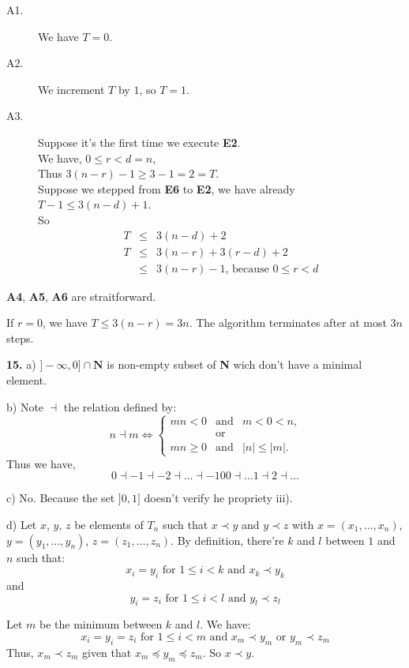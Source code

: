 \documentclass[a4paper,12pt]{article}
\begin{document}
\begin{description}
\item[A1.]
We have $T = 0$.
\item[A2.]
We increment $T$ by $1$, so $T = 1$.
\item[A3.]
Suppose it's the first time we execute \textbf{E2}.\\
We have, $0 \le r < d = n$,\\
Thus $3(n-r)-1 \ge 3 - 1 = 2 = T$.\\
Suppose we stepped from \textbf{E6} to \textbf{E2}, we have already
$ T - 1 \le 3(n - d)+1$.\\
So
\begin{eqnarray*}
T & \le & 3(n-d) + 2\\
T & \le & 3(n-r) + 3(r-d) + 2\\
& \le & 3(n-r) - 1\mbox{, because } 0 \le r < d
\end{eqnarray*}

\end{description}

\textbf{A4}, \textbf{A5}, \textbf{A6} are straitforward.

\medskip
If $r = 0$, we have $T \le 3(n-r) = 3n$.  The algorithm terminates after at
most $3n$ steps.

\bigskip
\noindent
\textbf{15.}
a) $\rbrack -\infty, 0 \rbrack \cap \mathbf{N}$ is non-empty subset of 
\textbf{N} wich don't have a minimal element.

b) Note $\dashv$ the relation defined by:
\[ n \dashv m \Leftrightarrow \left\{\begin{array}{lll}
	mn < 0 & \mbox{and} & m < 0 < n\mbox{,}\\
	& \mbox{or} &\\
        mn \ge 0 & \mbox{and} & |n| \le |m|. \end{array}\right. \]
Thus we have,
 \[ 0 \dashv -1 \dashv -2 \dashv \ldots \dashv -100 \dashv \ldots 1 \dashv 
2 \dashv \ldots \]

c) No.  Because the set $\rbrack 0, 1 \rbrack$ doesn't verify he propriety iii).

d) Let $x$, $y$, $z$ be elements of $T_n$ such that $x \prec y$ and
 $y \prec z$ with $x = (x_1, \ldots, x_n)$, $y = (y_1, \ldots, y_n)$, 
$z = (z_1, \ldots, z_n)$. By definition, there're $k$ and $l$ between $1$ 
and $n$ such that:
\[x_i = y_i \mbox{ for } 1 \le i < k \mbox{ and } x_k \prec y_k \] and
\[y_i = z_i \mbox{ for } 1 \le i < l \mbox{ and } y_l \prec z_l \]

Let $m$ be the minimum between $k$ and $l$. We have:
\[ x_i = y_i = z_i \mbox{ for } 1 \le i < m \mbox { and } x_m \prec y_m
\mbox{  or } y_m \prec z_m\]
Thus, $x_m \prec z_m$ given that $x_m \preceq y_m \preceq z_m$. 
So $x \prec y$.
\end{document}
